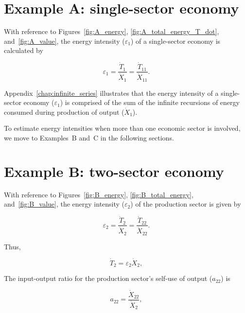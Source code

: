 \section{Example A: single-sector economy} %

With reference to Figures~\ref{fig:A_energy}, 
\ref{fig:A_total_energy_T_dot}, 
and~\ref{fig:A_value},
the energy intensity ($\varepsilon_{1}$) of a single-sector economy is calculated by

\begin{equation} \label{eq:A-energy_intensity}
	\varepsilon_{1} 
	= \frac{\dot{T}_{1}}{\dot{X}_{1}} 
	= \frac{\dot{T}_{11}}{\dot{X}_{11}}.
\end{equation}

Appendix~\ref{chap:infinite_series} illustrates that the energy 
intensity of a single-sector economy ($\varepsilon_{1}$) 
is comprised of the sum of the infinite recursions
of energy consumed during production of output ($\dot{X}_{1}$).

To estimate energy intensities
when more than one economic sector is involved, 
we move to Examples~B and~C in the following sections.


\section{Example B: two-sector economy} %

With reference to Figures~\ref{fig:B_energy}, 
\ref{fig:B_total_energy},
and~\ref{fig:B_value}, 
the energy intensity ($\varepsilon_{2}$) 
of the production sector is given by

\begin{equation} \label{eq:single_sector_energy_intensity}
	\varepsilon_{2} 
	= \frac{\dot{T}_{2}}{\dot{X}_{2}} 
	= \frac{\dot{T}_{22}}{\dot{X}_{22}}.
\end{equation}

\noindent{}Thus,

\begin{equation} \label{eq:T_dot_1_single_sector}
	\dot{T}_{2} = \varepsilon_{2}\dot{X}_{2},
\end{equation}

The input-output ratio 
for the production sector's self-use of output ($a_{22}$) is

\begin{equation} \label{eq:io_ratio_single_sector}
	a_{22} = \frac{\dot{X}_{22}}{\dot{X}_{2}},
\end{equation}

